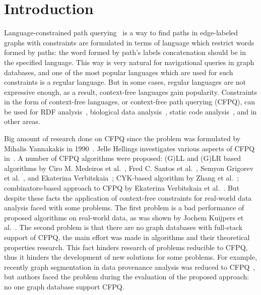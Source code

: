 \section{Introduction}

Language-constrained path querying~\cite{doi:10.1137/S0097539798337716} is a way to find paths in edge-labeled graphs with constraints are formulated in terms of language which restrict words formed by paths: the word formed by path's labels concatenation should be in the specified language.
This way is very natural for navigational queries in graph databases, and one of the most popular languages which are used for such constraints is a regular language. 
But in some cases, regular languages are not expressive enough, as a result, context-free languages gain popularity.
Constraints in the form of context-free languages, or context-free path querying (CFPQ), can be used for RDF analysis~\cite{10.1007/978-3-319-46523-4_38}, biological data analysis~\cite{SubgraphQueriesbyContextfreeGrammars}, static code analysis~\cite{Zheng,10.1145/373243.360208}, and in other areas.

Big amount of research done on CFPQ since the problem was formulated by Mihalis Yannakakis in 1990~\cite{Yannakakis}. 
Jelle Hellings investigates various aspects of CFPQ in~\cite{hellingsPathQuerying,hellingsRelational,DBLP:journals/corr/Hellings15}.
A number of CFPQ algorithms were proposed: (G)LL and (G)LR based algorithms by Ciro M. Medeiros et al.~\cite{Medeiros:2018:EEC:3167132.3167265}, Fred C. Santos et al.~\cite{10.1007/978-3-319-91662-0_17}, Semyon Grigorev et al.~\cite{Grigorev:2017:CPQ:3166094.3166104}, and Ekaterina Verbitskaia~\cite{10.1007/978-3-319-41579-6_22}; CYK-based algorithm by Zhang et al.~\cite{RDF}; combinators-based approach to CFPQ by Ekaterina Verbitskaia et al.~\cite{Verbitskaia:2018:PCC:3241653.3241655}. 
But despite these facts the application of context-free constraints for real-world data analysis faced with some problems.
The first problem is a bad performance of proposed algorithms on real-world data, as was shown by Jochem Kuijpers et al.~\cite{Kuijpers:2019:ESC:3335783.3335791}.
The second problem is that there are no graph databases with full-stack support of CFPQ, the main effort was made in algorithms and their theoretical properties research.
This fact hinders research of problems reducible to CFPQ, thus it hinders the development of new solutions for some problems.
For example, recently graph segmentation in data provenance analysis was reduced to CFPQ~\cite{8731467}, but authors faced the problem during the evaluation of the proposed approach: no one graph database support CFPQ.

